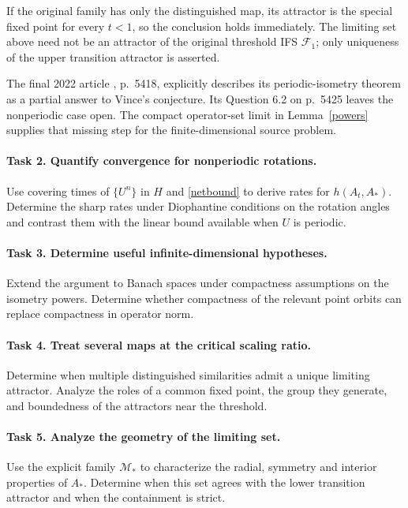 \documentclass[11pt]{article}
\begin{document}
If the original family has only the distinguished map, its attractor is
the special fixed point for every $t<1$, so the conclusion holds immediately.
The limiting set above need not be an attractor of the original threshold
IFS $\mathcal F_1$; only uniqueness of the upper transition attractor is asserted.

The final 2022 article \cite{LSSV}, p.~5418, explicitly describes its
periodic-isometry theorem as a partial answer to Vince's conjecture. Its
Question 6.2 on p.~5425 leaves the nonperiodic case open. The compact
operator-set limit in Lemma~\ref{powers} supplies that missing step for
the finite-dimensional source problem.

\paragraph{Task 2. Quantify convergence for nonperiodic rotations.}
Use covering times of $\{U^n\}$ in $H$ and \eqref{netbound} to derive
rates for $h(A_t,A_*)$. Determine the sharp rates under Diophantine
conditions on the rotation angles and contrast them with the linear bound
available when $U$ is periodic.

\paragraph{Task 3. Determine useful infinite-dimensional hypotheses.}
Extend the argument to Banach spaces under compactness assumptions on the
isometry powers. Determine whether compactness of the relevant point
orbits can replace compactness in operator norm.

\paragraph{Task 4. Treat several maps at the critical scaling ratio.}
Determine when multiple distinguished similarities admit a unique limiting
attractor. Analyze the roles of a common fixed point, the group they
generate, and boundedness of the attractors near the threshold.

\paragraph{Task 5. Analyze the geometry of the limiting set.}
Use the explicit family $\mathcal M_*$ to characterize the radial,
symmetry and interior properties of $A_*$. Determine when this set agrees
with the lower transition attractor and when the containment is strict.
\end{document}
